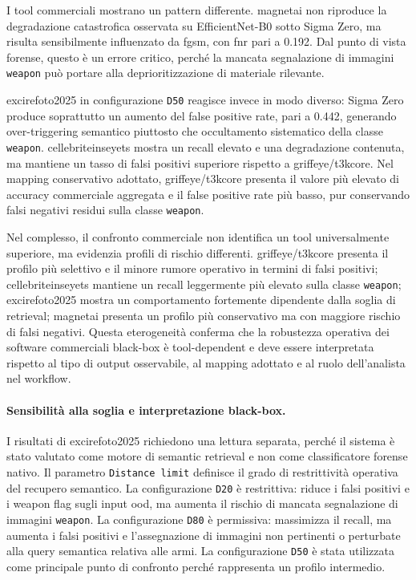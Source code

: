I tool commerciali mostrano un pattern differente. \gls{magnetai} non riproduce
la degradazione catastrofica osservata su EfficientNet-B0 sotto Sigma Zero, ma
risulta sensibilmente influenzato da \gls{fgsm}, con \gls{fnr} pari a 0.192. Dal
punto di vista forense, questo è un errore critico, perché la mancata
segnalazione di immagini \texttt{weapon} può portare alla deprioritizzazione di
materiale rilevante.

\gls{excirefoto2025} in configurazione \texttt{D50} reagisce invece in modo
diverso: Sigma Zero produce soprattutto un aumento del false positive rate, pari
a 0.442, generando over-triggering semantico piuttosto che occultamento
sistematico della classe \texttt{weapon}. \gls{cellebriteinseyets} mostra un
recall elevato e una degradazione contenuta, ma mantiene un tasso di falsi
positivi superiore rispetto a \gls{griffeye}/\gls{t3kcore}.
Nel mapping conservativo adottato, \gls{griffeye}/\gls{t3kcore} presenta il valore
più elevato di accuracy commerciale aggregata e il false positive rate più basso, pur conservando
falsi negativi residui sulla classe \texttt{weapon}.

Nel complesso, il confronto commerciale non identifica un tool universalmente
superiore, ma evidenzia profili di rischio differenti.
\gls{griffeye}/\gls{t3kcore} presenta il profilo più selettivo e il minore
rumore operativo in termini di falsi positivi; \gls{cellebriteinseyets} mantiene
un recall leggermente più elevato sulla classe \texttt{weapon};
\gls{excirefoto2025} mostra un comportamento fortemente dipendente dalla soglia
di retrieval; \gls{magnetai} presenta un profilo più conservativo ma con maggiore
rischio di falsi negativi. Questa eterogeneità conferma che la robustezza
operativa dei software commerciali black-box è tool-dependent e deve essere
interpretata rispetto al tipo di output osservabile, al mapping adottato e al
ruolo dell'analista nel workflow.

\paragraph{Sensibilità alla soglia e interpretazione black-box.}

I risultati di \gls{excirefoto2025} richiedono una lettura separata, perché il
sistema è stato valutato come motore di semantic retrieval e non come
classificatore forense nativo. Il parametro \texttt{Distance limit} definisce il grado di restrittività
operativa del recupero semantico. La configurazione \texttt{D20} è
restrittiva: riduce i falsi positivi e i weapon flag sugli input \gls{ood}, ma
aumenta il rischio di mancata segnalazione di immagini \texttt{weapon}. La
configurazione \texttt{D80} è permissiva: massimizza il recall, ma aumenta i
falsi positivi e l'assegnazione di immagini non pertinenti o perturbate alla
query semantica relativa alle armi. La configurazione \texttt{D50} è stata
utilizzata come principale punto di confronto perché rappresenta un profilo
intermedio.

